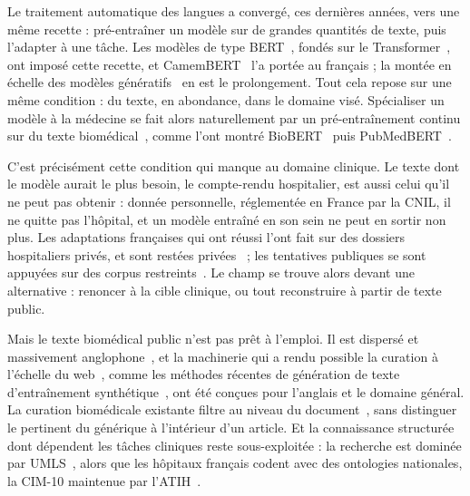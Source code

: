 
\noindent Le traitement automatique des langues a convergé, ces dernières années, vers une même
recette : pré-entraîner un modèle sur de grandes quantités de texte, puis l'adapter à
une tâche. Les modèles de type BERT~\citep{devlin_bert_2019}, fondés sur le
Transformer~\citep{vaswani2017attention}, ont imposé cette recette, et
CamemBERT~\citep{martin-etal-2020-camembert} l'a portée au français ; la montée en
échelle des modèles génératifs~\citep{gpt3,touvron2023llama} en est le prolongement.
Tout cela repose sur une même condition : du texte, en abondance, dans le domaine visé.
Spécialiser un modèle à la médecine se fait alors naturellement par un pré-entraînement
continu sur du texte biomédical~\citep{gururangan_dont_2020}, comme l'ont montré
BioBERT~\citep{lee_biobert_2019} puis PubMedBERT~\citep{gu_domain-specific_2022}.

C'est précisément cette condition qui manque au domaine clinique. Le texte dont le modèle
aurait le plus besoin, le compte-rendu hospitalier, est aussi celui qu'il ne peut pas
obtenir : donnée personnelle, réglementée en France par la CNIL, il ne quitte pas
l'hôpital, et un modèle entraîné en son sein ne peut en sortir non plus. Les
adaptations françaises qui ont réussi l'ont fait sur des dossiers hospitaliers privés,
et sont restées privées~\citep{dura_learning_2022} ; les tentatives publiques se sont
appuyées sur des corpus restreints~\citep{copara_contextualized_2020,le_clercq_de_lannoy_strategies_2022}.
Le champ se trouve alors devant une alternative : renoncer à la cible clinique, ou tout
reconstruire à partir de texte public.

Mais le texte biomédical public n'est pas prêt à l'emploi. Il est dispersé et
massivement anglophone~\citep{labrak-etal-2024-biomistral}, et la machinerie qui a rendu
possible la curation à l'échelle du web~\citep{penedo2024fineweb}, comme les méthodes
récentes de génération de texte d'entraînement synthétique~\citep{yang2025entigraph},
ont été conçues pour l'anglais et le domaine général. La curation biomédicale existante
filtre au niveau du document~\citep{chen2023meditron}, sans distinguer le pertinent du
générique à l'intérieur d'un article. Et la connaissance structurée dont dépendent
les tâches cliniques reste sous-exploitée : la recherche est dominée par UMLS~\citep{lindberg_unified_1993},
alors que les hôpitaux français codent avec des ontologies nationales, la CIM-10
maintenue par l'ATIH~\citep{atih_pmsi}.

